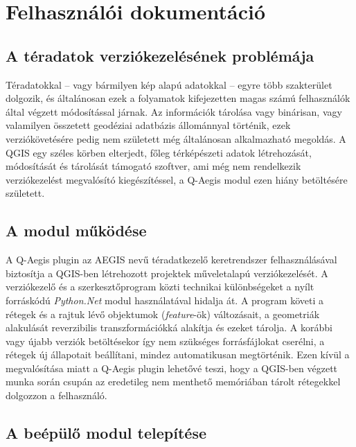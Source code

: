 \chapter{Felhasználói dokumentáció}
\label{ch:user}
\section{A téradatok verziókezelésének problémája}
Téradatokkal -- vagy bármilyen kép alapú adatokkal -- egyre több szakterület dolgozik, és általánosan ezek a folyamatok kifejezetten magas számú felhasználók által végzett módosítással járnak. Az információk tárolása vagy binárisan, vagy valamilyen összetett geodéziai adatbázis állománnyal történik, ezek verziókövetésére pedig nem született még általánosan alkalmazható megoldás. A QGIS egy széles körben elterjedt, főleg térképészeti adatok létrehozását, módosítását és tárolását támogató szoftver, ami még nem rendelkezik verziókezelést megvalósító kiegészítéssel, a Q-Aegis modul ezen hiány betöltésére született.
\section{A modul működése}
A Q-Aegis plugin az AEGIS nevű téradatkezelő keretrendszer felhasználásával biztosítja a QGIS-ben létrehozott projektek műveletalapú verziókezelését. A verziókezelő és a szerkesztőprogram közti technikai különbségeket a nyílt forráskódú \emph{Python.Net} \cite{pythonnet} modul használatával hidalja át. A program követi a rétegek és a rajtuk lévő objektumok (\emph{feature}-ök) változásait, a geometriák alakulását reverzibilis transzformációkká alakítja és ezeket tárolja. A korábbi vagy újabb verziók betöltésekor így nem szükséges forrásfájlokat cserélni, a rétegek új állapotait beállítani, mindez automatikusan megtörténik. Ezen kívül a megvalósítása miatt a Q-Aegis plugin lehetővé teszi, hogy a QGIS-ben végzett munka során csupán az eredetileg nem menthető memóriában tárolt rétegekkel dolgozzon a felhasználó.

\section{A beépülő modul telepítése}
